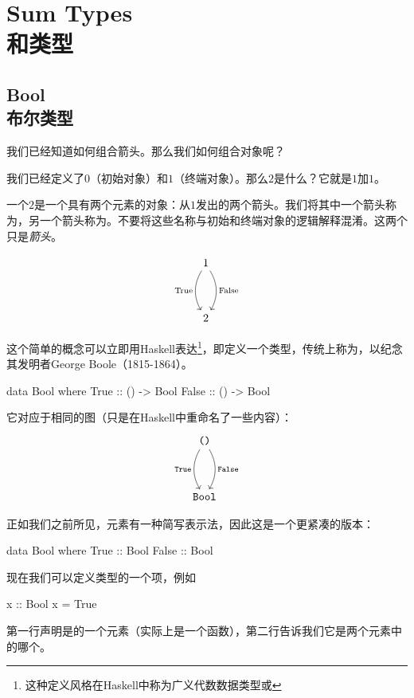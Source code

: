 \documentclass[DaoFP]{subfiles}
\begin{document}
 \setcounter{chapter}{3}

 \chapter{Sum Types\\和类型}

 \section{Bool\\布尔类型}

 我们已经知道如何组合箭头。那么我们如何组合对象呢？

 我们已经定义了$0$（初始对象）和$1$（终端对象）。那么$2$是什么？它就是$1$加$1$。

 一个$2$是一个具有两个元素的对象：从$1$发出的两个箭头。我们将其中一个箭头称为，另一个箭头称为。不要将这些名称与初始和终端对象的逻辑解释混淆。这两个只是\emph{箭头}。

 \[
  \begin{tikzcd}
   1
   \arrow[dd, bend right, "\text{True}"']
   \arrow[dd, bend left, "\text{False}"]
   \\
   \\
   2
  \end{tikzcd}
 \]

 这个简单的概念可以立即用Haskell表达\footnote{这种定义风格在Haskell中称为广义代数数据类型或}，即定义一个类型，传统上称为，以纪念其发明者George Boole（1815-1864）。

 \begin{haskell}
  data Bool where
  True  :: () -> Bool
  False :: () -> Bool
 \end{haskell}
 它对应于相同的图（只是在Haskell中重命名了一些内容）：
 \[
  \begin{tikzcd}
   \hask{()}
   \arrow[dd, bend right, "\hask{True}"']
   \arrow[dd, bend left, "\hask{False}"]
   \\
   \\
   \hask{Bool}
  \end{tikzcd}
 \]

 正如我们之前所见，元素有一种简写表示法，因此这是一个更紧凑的版本：

 \begin{haskell}
  data Bool where
  True  :: Bool
  False :: Bool
 \end{haskell}

 现在我们可以定义类型的一个项，例如
 \begin{haskell}
  x :: Bool
  x = True
 \end{haskell}
 第一行声明是的一个元素（实际上是一个函数），第二行告诉我们它是两个元素中的哪个。
\end{document}
